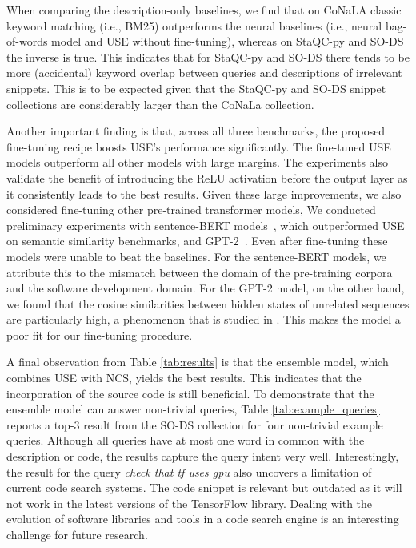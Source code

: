 \documentclass[12pt,conference, onecolumn]{IEEEtran}
\begin{document}
 
When comparing the description-only baselines, we find that on CoNaLA classic keyword matching (i.e., BM25) outperforms the neural baselines (i.e., neural bag-of-words model and USE without fine-tuning), whereas on StaQC-py and SO-DS the inverse is true. This indicates that for StaQC-py and SO-DS there tends to be more (accidental) keyword overlap between queries and descriptions of irrelevant snippets. This is to be expected given that the StaQC-py and SO-DS snippet collections are considerably larger than the CoNaLa collection.

Another important finding is that, across all three benchmarks, the proposed fine-tuning recipe boosts USE's performance significantly.  The fine-tuned USE models outperform all other models with large margins. The experiments also validate the benefit of introducing the ReLU activation before the output layer as it consistently leads to the best results.  Given these large improvements, we also considered fine-tuning other pre-trained transformer models, We conducted preliminary experiments with sentence-BERT models~\cite{reimers-gurevych-2019-sentence}, which outperformed USE on semantic similarity benchmarks, and GPT-2~\cite{radford2019language}.  Even after fine-tuning these models were unable to beat the baselines. For the sentence-BERT models, we attribute this to the mismatch between the domain of the pre-training corpora and the software development domain. For the GPT-2 model, on the other hand, we found that the cosine similarities between hidden states of unrelated sequences are particularly high, a phenomenon that is studied in \citet{ethayarajh2019contextual}. This makes the model a poor fit for our fine-tuning procedure.

A final observation from Table \ref{tab:results} is that the ensemble model, which combines USE with NCS,  yields the best results. This indicates that the incorporation of the source code is still beneficial. To demonstrate that the ensemble model can answer non-trivial queries,  Table \ref{tab:example_queries} reports a top-3 result from the SO-DS collection for four non-trivial example queries. Although all queries have at most one word in common with the description or code, the results capture the query intent very well. Interestingly, the result for the query \textit{check that tf uses gpu} also uncovers a limitation of current code search systems. The code snippet is relevant but outdated as it will not work in the latest versions of the TensorFlow library. Dealing with the evolution of software libraries and tools in a code search engine is an interesting challenge for future research.
\end{document}
